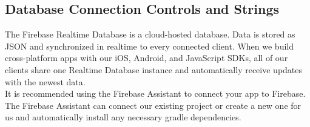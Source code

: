 	\subsection{Database Connection Controls and Strings}
	The Firebase Realtime Database is a cloud-hosted database. Data is stored as JSON and synchronized in realtime to every connected client. When we build cross-platform apps with our iOS, Android, and JavaScript SDKs, all of our clients share one Realtime Database instance and automatically receive updates with the newest data. \\
	
	It is recommended using the Firebase Assistant to connect your app to Firebase. The Firebase Assistant can connect our existing project or create a new one for us and automatically install any necessary gradle dependencies.\\

	
